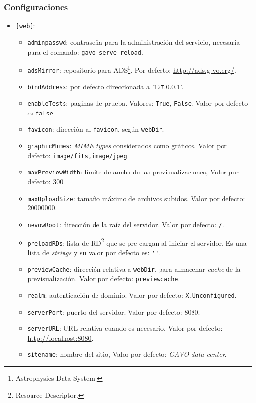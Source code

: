 \subsubsection*{Configuraciones}

\begin{itemize}
	\item \verb;[web];:
		\begin{itemize}
			\item \verb;adminpasswd;: contraseña para la administración del servicio, necesaria para el comando: \verb;gavo serve reload;.
			\item \verb;adsMirror;: repositorio para ADS\footnote{Astrophysics Data System.}. Por defecto: \url{http://ads.g-vo.org/}.
			\item \verb;bindAddress;: por defecto direccionada a  '127.0.0.1'.
			\item \verb;enableTests;: paginas de prueba. Valores: \verb;True;, \verb;False;. Valor por defecto es \verb;false;.
			\item \verb;favicon;: dirección al \verb;favicon;, según \verb;webDir;.
			\item \verb;graphicMimes;: \emph{MIME types} considerados como gráficos. Valor por defecto: \verb;image/fits,image/jpeg;.
			\item \verb;maxPreviewWidth;: límite de ancho de las previsualizaciones, Valor por defecto: 300.
			\item \verb;maxUploadSize;: tamaño máximo de archivos subidos. Valor por defecto: 20000000.
			\item \verb;nevowRoot;: dirección de la raíz del servidor. Valor por defecto: \verb;/;.
			\item \verb;preloadRDs;: lista de RD\footnote{Resource Descriptor.} que se pre cargan al iniciar el servidor. Es una lista de \emph{strings} y su valor por defecto es: \verb;'';.
			\item \verb;previewCache;: dirección relativa a \verb;webDir;, para almacenar \emph{cache} de la previsualización. Valor por defecto: \verb;previewcache;.
			\item \verb;realm;: autenticación de dominio. Valor por defecto: \verb;X.Unconfigured;.
			\item \verb;serverPort;: puerto del servidor. Valor por defecto: 8080.
			\item \verb;serverURL;: URL relativa cuando es necesario. Valor por defecto: \url{http://localhost:8080}.
			\item \verb;sitename;: nombre del sitio, Valor por defecto: \emph{GAVO data center}.

\end{itemize}
\end{itemize}
